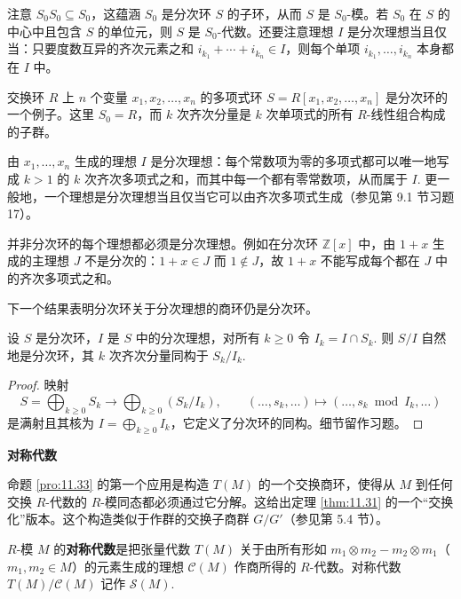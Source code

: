 注意 \(S_0S_0 \subseteq S_0\)，这蕴涵 \(S_0\) 是分次环 \(S\) 的子环，从而 \(S\) 是 \(S_0\)-模。若 \(S_0\) 在 \(S\) 的中心中且包含 \(S\) 的单位元，则 \(S\) 是 \(S_0\)-代数。还要注意理想 \(I\) 是分次理想当且仅当：只要度数互异的齐次元素之和 \(i_{k_1}+\cdots+i_{k_n} \in I\)，则每个单项 \(i_{k_1}, \ldots, i_{k_n}\) 本身都在 \(I\) 中。

\begin{example}
交换环 \(R\) 上 \(n\) 个变量 \(x_1, x_2, \ldots, x_n\) 的多项式环 \(S = R[x_1, x_2, \ldots, x_n]\) 是分次环的一个例子。这里 \(S_0 = R\)，而 \(k\) 次齐次分量是 \(k\) 次单项式的所有 \(R\)-线性组合构成的子群。

由 \(x_1, \ldots, x_n\) 生成的理想 \(I\) 是分次理想：每个常数项为零的多项式都可以唯一地写成 \(k > 1\) 的 \(k\) 次齐次多项式之和，而其中每一个都有零常数项，从而属于 \(I\). 更一般地，一个理想是分次理想当且仅当它可以由齐次多项式生成（参见第 9.1 节习题 17）。

并非分次环的每个理想都必须是分次理想。例如在分次环 \(\mathbb{Z}[x]\) 中，由 \(1+x\) 生成的主理想 \(J\) 不是分次的：\(1+x \in J\) 而 \(1 \notin J\)，故 \(1+x\) 不能写成每个都在 \(J\) 中的齐次多项式之和。
\end{example}

下一个结果表明分次环关于分次理想的商环仍是分次环。

\begin{proposition}\label{pro:11.33}
设 \(S\) 是分次环，\(I\) 是 \(S\) 中的分次理想，对所有 \(k \geq 0\) 令 \(I_k = I \cap S_k\). 则 \(S/I\) 自然地是分次环，其 \(k\) 次齐次分量同构于 \(S_k/I_k\).
\end{proposition}

\begin{proof}
映射
\[
S = \bigoplus_{k \geq 0} S_k \longrightarrow \bigoplus_{k \geq 0}(S_k/I_k), \qquad (\ldots, s_k, \ldots) \longmapsto (\ldots, s_k \bmod I_k, \ldots)
\]
是满射且其核为 \(I = \bigoplus_{k \geq 0} I_k\)，它定义了分次环的同构。细节留作习题。
\end{proof}

\noindent\textbf{对称代数}

命题 \ref{pro:11.33} 的第一个应用是构造 \(T(M)\) 的一个交换商环，使得从 \(M\) 到任何交换 \(R\)-代数的 \(R\)-模同态都必须通过它分解。这给出定理 \ref{thm:11.31} 的一个“交换化”版本。这个构造类似于作群的交换子商群 \(G/G'\)（参见第 5.4 节）。

\begin{definition}
\(R\)-模 \(M\) 的\textbf{对称代数}是把张量代数 \(T(M)\) 关于由所有形如 \(m_1 \otimes m_2-m_2 \otimes m_1\)（\(m_1, m_2 \in M\)）的元素生成的理想 \(\mathcal{C}(M)\) 作商所得的 \(R\)-代数。对称代数 \(T(M)/\mathcal{C}(M)\) 记作 \(\mathcal{S}(M)\).
\end{definition}

